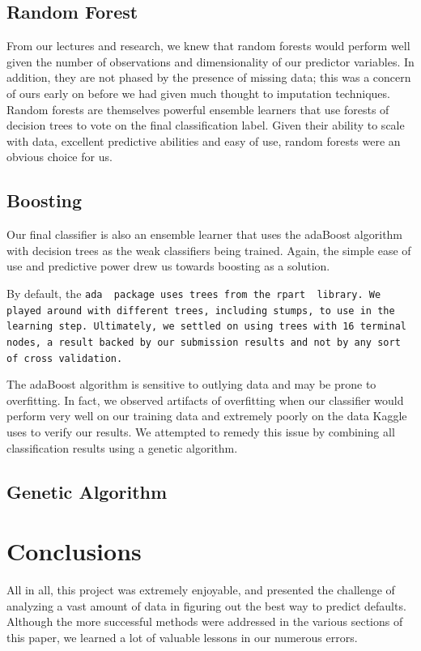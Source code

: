 \documentclass[11pt, oneside]{article}   	%
\begin{document}
	\subsection{Random Forest}
	From our lectures
	and research, we knew that random forests would perform well given the number of
	observations and dimensionality of our predictor variables. In addition, they are not phased by the
	presence of missing data; this was a concern of ours early on before we had given much thought
	to imputation techniques. Random forests are themselves powerful ensemble learners that 
	use forests of decision trees to vote on the final classification label. Given their
	ability to scale with data, excellent predictive abilities and easy of use, random forests were an obvious choice for us.
	\subsection{Boosting}
	Our final classifier is also an ensemble learner that uses the adaBoost algorithm with decision 
	trees as the weak classifiers being trained. Again, the simple ease of use and predictive
	power drew us towards boosting as a solution. 
	
	 By default, the \tt ada\rm~ package uses trees from the \tt rpart
	\rm~library. We played around with different trees, including stumps, to use in the learning step. 	Ultimately, we settled
	on using trees with 16 terminal nodes, a result backed by our submission results and not by
	any sort of cross validation.
	
	The adaBoost algorithm is sensitive to outlying data and may be prone to overfitting. In fact,
	we observed artifacts of overfitting when our classifier would perform very well on
	our training data and extremely poorly on the data Kaggle uses to verify our results. 
	We attempted to remedy this issue by combining all classification results using a 
	genetic algorithm.
	\subsection{Genetic Algorithm}
\section{Conclusions}
	All in all, this project was extremely enjoyable, and presented the challenge of analyzing a vast amount of data in figuring out the best way to predict defaults. Although the more successful methods were addressed in the various sections of this paper, we learned a lot of valuable lessons in our numerous errors.
	
\end{document}
